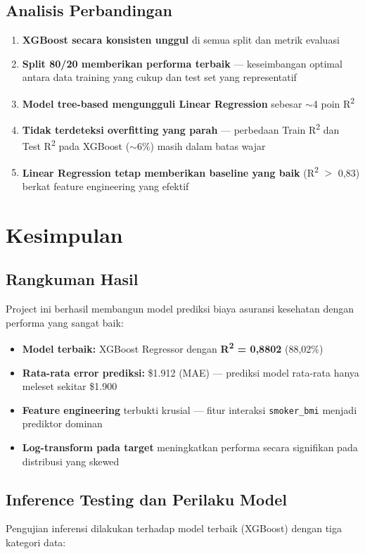\documentclass[12pt,a4paper]{article}
\begin{document}
\subsection{Analisis Perbandingan}
\begin{enumerate}
    \item \textbf{XGBoost secara konsisten unggul} di semua split dan metrik evaluasi
    \item \textbf{Split 80/20 memberikan performa terbaik} — keseimbangan optimal antara data training yang cukup dan test set yang representatif
    \item \textbf{Model tree-based mengungguli Linear Regression} sebesar ${\sim}$4 poin R\textsuperscript{2}
    \item \textbf{Tidak terdeteksi overfitting yang parah} — perbedaan Train R\textsuperscript{2} dan Test R\textsuperscript{2} pada XGBoost (${\sim}$6\%) masih dalam batas wajar
    \item \textbf{Linear Regression tetap memberikan baseline yang baik} (R\textsuperscript{2} $>$ 0,83) berkat feature engineering yang efektif
\end{enumerate}


\section{Kesimpulan}

\subsection{Rangkuman Hasil}
Project ini berhasil membangun model prediksi biaya asuransi kesehatan dengan performa yang sangat baik:
\begin{itemize}
    \item \textbf{Model terbaik:} XGBoost Regressor dengan \textbf{R\textsuperscript{2} = 0,8802} (88,02\%)
    \item \textbf{Rata-rata error prediksi:} \$1.912 (MAE) — prediksi model rata-rata hanya meleset sekitar \$1.900
    \item \textbf{Feature engineering} terbukti krusial — fitur interaksi \texttt{smoker\_bmi} menjadi prediktor dominan
    \item \textbf{Log-transform pada target} meningkatkan performa secara signifikan pada distribusi yang skewed
\end{itemize}

\subsection{Inference Testing dan Perilaku Model}
Pengujian inferensi dilakukan terhadap model terbaik (XGBoost) dengan tiga kategori data:
\end{document}
